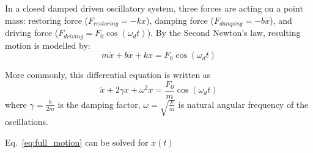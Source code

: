 In a closed damped driven oscillatory system, three forces are acting on a point mass: restoring force ($F_{restoring} = -kx$), damping force ($F_{damping} = -b\dot{x}$), and driving force ($F_{driving} = F_0 \cos(\omega_d t)$). By the Second Newton's law, resulting motion is modelled by:
\begin{equation*}
    m\ddot{x} + b\dot{x} + kx = F_0 \cos(\omega_d t)
\end{equation*}

More commonly, this differential equation is written as
\begin{equation} \label{eq:full_motion}
    \ddot{x} + 2\gamma \dot{x} + \omega^2 x = \frac{F_0}{m} \cos(\omega_d t)
\end{equation} where $\gamma = \frac{b}{2m}$ is the damping factor, $\omega = \sqrt{\frac{k}{m}}$ is natural angular frequency of the oscillations.

Eq.~\eqref{eq:full_motion} can be solved for $x(t)$ 
